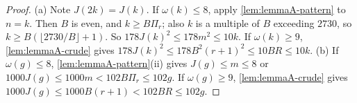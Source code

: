 \begin{proof}
(a) Note $J(2k)=J(k)$. If $\omega(k)\le8$, apply
\autoref{lem:lemmaA-pattern} to $n=k$. Then $B$ is even, and $k\ge B\Pi_r$;
also $k$ is a multiple of $B$ exceeding $2730$, so
$k\ge B(\lfloor2730/B\rfloor+1)$. So $178J(k)^2\le178m^2\le10k$. If
$\omega(k)\ge9$, \autoref{lem:lemmaA-crude} gives
$178J(k)^2\le178B^2(r+1)^2\le10BR\le10k$.
(b) If $\omega(g)\le8$, \autoref{lem:lemmaA-pattern}(ii) gives $J(g)\le m\le8$
or $1000J(g)\le1000m<102B\Pi_r\le102g$. If $\omega(g)\ge9$,
\autoref{lem:lemmaA-crude} gives $1000J(g)\le1000B(r+1)<102BR\le102g$.
\end{proof}


